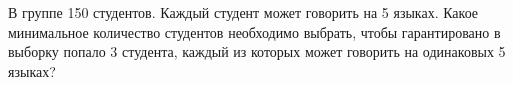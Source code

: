\question 
В группе 150 студентов. Каждый студент может говорить на 5 языках. Какое минимальное количество студентов необходимо выбрать, чтобы гарантировано в выборку попало 3 студента, каждый из которых может говорить на одинаковых 5 языках?


